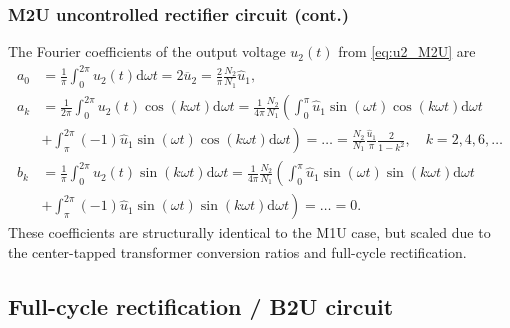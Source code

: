 \begin{frame}
    \frametitle{M2U uncontrolled rectifier circuit (cont.)}
    The Fourier coefficients of the output voltage $u_2(t)$ from \eqref{eq:u2_M2U} are
    \begin{equation}
        \begin{split}
            a_0 &= \frac{1}{\pi} \int_{0}^{2\pi} u_2(t) \mathrm{d} \omega t = 2 \overline{u}_2= \frac{2}{\pi}\frac{N_2}{N_1}\hat{u}_1,\\
            a_k &= \frac{1}{2\pi} \int_{0}^{2\pi} u_2(t) \cos(k\omega t) \mathrm{d}\omega t = \frac{1}{4\pi}\frac{N_2}{N_1}\left( \int_{0}^{\pi} \hat{u}_1 \sin(\omega t) \cos(k\omega t) \mathrm{d}\omega t \right.\\ & \left.+ \int_{\pi}^{2\pi} (-1)\hat{u}_1 \sin(\omega t) \cos(k\omega t) \mathrm{d}\omega t\right) = \ldots =  \frac{N_2}{N_1}\frac{\hat{u}_1}{\pi}\frac{2}{1-k^2}, \quad k=2,4,6,\ldots\\
            b_k &= \frac{1}{\pi} \int_{0}^{2\pi} u_2(t) \sin(k\omega t) \mathrm{d}\omega t = \frac{1}{4\pi}\frac{N_2}{N_1}\left( \int_{0}^{\pi} \hat{u}_1 \sin(\omega t) \sin(k\omega t) \mathrm{d}\omega t \right.\\ & \left.+ \int_{\pi}^{2\pi} (-1)\hat{u}_1 \sin(\omega t) \sin(k\omega t) \mathrm{d}\omega t\right) = \ldots = 0.
        \end{split}
        \label{eq:u2_M2U_Fourier}
    \end{equation}
    These coefficients are structurally identical to the M1U case, but scaled due to the center-tapped transformer conversion ratios and full-cycle rectification.
\end{frame}

\subsection{Full-cycle rectification / B2U circuit} 

